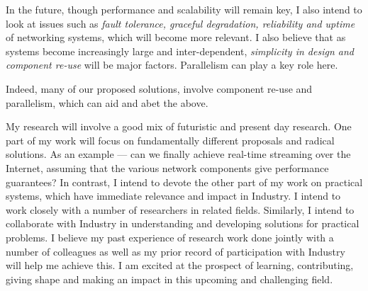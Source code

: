 \documentclass[a4paper, 10pt]{article}
\begin{document}
\begin{small}
 In the future, though performance and scalability will remain key,
I also intend to look at issues such as {\it fault tolerance, graceful degradation,
reliability and uptime} of networking systems, which will become more relevant. 
I also believe that as systems become increasingly large and 
inter-dependent, {\it simplicity in design and component 
re-use} will be major factors.
Parallelism can play a key role here.

Indeed, many of our proposed solutions, involve component re-use and 
parallelism, which can aid and abet the above.

 My research will involve a good mix of futuristic and present 
day research. 
One part of my work will focus on fundamentally different proposals and
radical solutions. As an example
--- can we finally achieve real-time streaming over the Internet,
assuming that the various network components give performance guarantees?
In contrast, I intend to devote the other part of my work 
on practical systems, which have immediate relevance and impact in Industry.
I intend to work closely with a number of
researchers in related fields. Similarly, I intend to
collaborate with Industry in understanding and developing solutions
for practical problems. I believe my past experience of research
work done jointly with a number of colleagues as well as my prior record
of participation with Industry will help me achieve this. 
I am excited at the
prospect of learning, contributing, giving shape and making an
impact in this upcoming and challenging field.  





\vspace{0.5cm}

\end{small}
\end{document}
